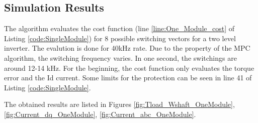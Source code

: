 \documentclass{article}
\begin{document}
\subsection{Simulation Results}

The algorithm evaluates the cost function (line \ref{line:One_Module_cost} of Listing \ref{code:SingleModule}) for 8 possible switching vectors for a two level inverter. The evalution is done for 40kHz rate. Due to the property of the MPC algorithm, the switching frequency varies. In one second, the switchings are around 12-14 kHz. For the beginning, the cost function only evaluates the torque error and the Id current. Some limits for the protection can be seen in line 41 of Listing \ref{code:SingleModule}.

The obtained results are listed in Figures \ref{fig:Tload_Wshaft_OneModule}, \ref{fig:Current_dq_OneModule}, \ref{fig:Current_abc_OneModule}.
\end{document}
